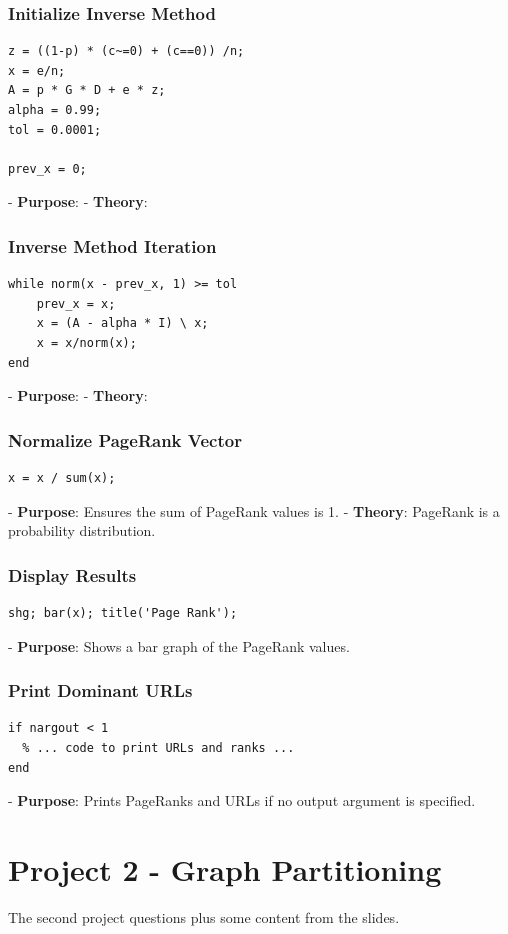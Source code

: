 \documentclass[unicode,11pt,a4paper,oneside,numbers=endperiod,openany]{scrartcl}
\begin{document}
\subsubsection{Initialize Inverse Method}
\begin{lstlisting}
z = ((1-p) * (c~=0) + (c==0)) /n;
x = e/n;
A = p * G * D + e * z;
alpha = 0.99;
tol = 0.0001;

prev_x = 0;

\end{lstlisting}
- \textbf{Purpose}:
- \textbf{Theory}:

\subsubsection{Inverse Method Iteration}
\begin{lstlisting}
while norm(x - prev_x, 1) >= tol
	prev_x = x;
	x = (A - alpha * I) \ x;
	x = x/norm(x);
end
\end{lstlisting}
- \textbf{Purpose}:
- \textbf{Theory}:

\subsubsection{Normalize PageRank Vector}
\begin{lstlisting}
x = x / sum(x);
\end{lstlisting}
- \textbf{Purpose}: Ensures the sum of PageRank values is 1.
- \textbf{Theory}: PageRank is a probability distribution.

\subsubsection{Display Results}
\begin{lstlisting}
shg; bar(x); title('Page Rank');
\end{lstlisting}
- \textbf{Purpose}: Shows a bar graph of the PageRank values.

\subsubsection{Print Dominant URLs}
\begin{lstlisting}
if nargout < 1
  % ... code to print URLs and ranks ...
end
\end{lstlisting}
- \textbf{Purpose}: Prints PageRanks and URLs if no output argument is specified.


\section{Project 2 - Graph Partitioning}
The second project questions plus some content from the slides.
\end{document}
